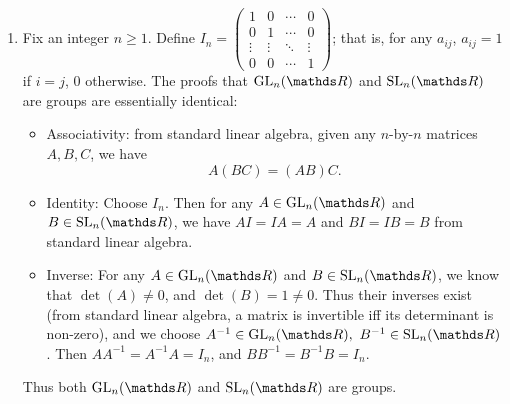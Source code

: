 \documentclass{homework}
\begin{document}
\begin{solution}
\begin{enumerate}[label=(\alph*)]
    \item Fix an integer $n\ge 1$. Define $I_n=\begin{pmatrix} 1&0&\cdots&0\\0&1&\cdots&0\\
      \vdots&\vdots&\ddots&\vdots\\0&0&\cdots&1 \end{pmatrix} $; that is, for any $a_{ij}$,
      $a_{ij}=1$ if $i=j$, $0$ otherwise. The proofs that $\GL_n(\R)$ and $\SL_n(\R)$ are groups are
      essentially identical:
      \begin{itemize}
        \item Associativity: from standard linear algebra, given any $n$-by-$n$ matrices $A,B,C$, we
          have \[
            A(BC)=(AB)C
          .\] 
        \item Identity: Choose $I_n$. Then for any $A\in \GL_n(\R)$ and $B\in \SL_n(\R)$, we have
          $AI=IA=A$ and $BI=IB=B$ from standard linear algebra.
        \item Inverse: For any $A\in \GL_n(\R)$ and $B\in \SL_n(\R)$, we know that $\det(A)\neq
          0$, and $\det(B)=1\neq 0$. Thus their inverses exist (from standard linear algebra, a
          matrix is invertible iff its determinant is non-zero), and we choose $A^{-1}\in
          \GL_n(\R),\ B^{-1}\in \SL_n(\R)$. Then $A A^{-1}=A^{-1}A=I_n$, and $BB^{-1}=B^{-1}B=I_n$.
      \end{itemize}
      Thus both $\GL_n(\R)$ and $\SL_n(\R)$ are groups.
  \end{enumerate}
\end{solution}
\end{document}
